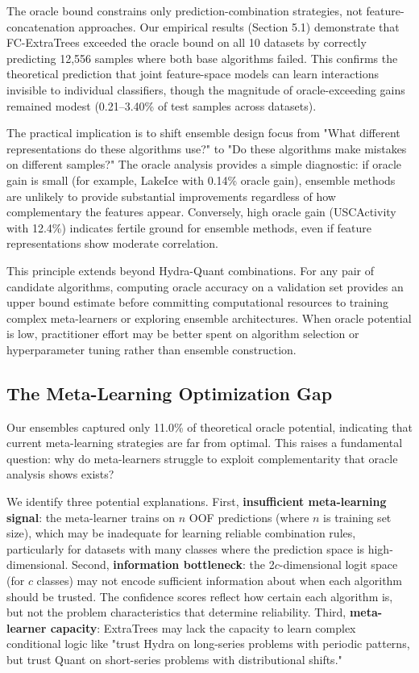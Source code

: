 \documentclass[pdflatex,sn-basic]{sn-jnl}           %
\theoremstyle{thmstyleone}%
\theoremstyle{thmstyletwo}%
\theoremstyle{thmstylethree}%
\begin{document}
The oracle bound constrains only prediction-combination strategies, not feature-concatenation approaches. Our empirical results (Section 5.1) demonstrate that FC-ExtraTrees exceeded the oracle bound on all 10 datasets by correctly predicting 12,556 samples where both base algorithms failed. This confirms the theoretical prediction that joint feature-space models can learn interactions invisible to individual classifiers, though the magnitude of oracle-exceeding gains remained modest (0.21--3.40\% of test samples across datasets).

The practical implication is to shift ensemble design focus from "What different representations do these algorithms use?" to "Do these algorithms make mistakes on different samples?" The oracle analysis provides a simple diagnostic: if oracle gain is small (for example, LakeIce with 0.14\% oracle gain), ensemble methods are unlikely to provide substantial improvements regardless of how complementary the features appear. Conversely, high oracle gain (USCActivity with 12.4\%) indicates fertile ground for ensemble methods, even if feature representations show moderate correlation.

This principle extends beyond Hydra-Quant combinations. For any pair of candidate algorithms, computing oracle accuracy on a validation set provides an upper bound estimate before committing computational resources to training complex meta-learners or exploring ensemble architectures. When oracle potential is low, practitioner effort may be better spent on algorithm selection or hyperparameter tuning rather than ensemble construction.

\subsection{The Meta-Learning Optimization Gap}

Our ensembles captured only 11.0\% of theoretical oracle potential, indicating that current meta-learning strategies are far from optimal. This raises a fundamental question: why do meta-learners struggle to exploit complementarity that oracle analysis shows exists?

We identify three potential explanations. First, \textbf{insufficient meta-learning signal}: the meta-learner trains on $n$ OOF predictions (where $n$ is training set size), which may be inadequate for learning reliable combination rules, particularly for datasets with many classes where the prediction space is high-dimensional. Second, \textbf{information bottleneck}: the 2$c$-dimensional logit space (for $c$ classes) may not encode sufficient information about when each algorithm should be trusted. The confidence scores reflect how certain each algorithm is, but not the problem characteristics that determine reliability. Third, \textbf{meta-learner capacity}: ExtraTrees may lack the capacity to learn complex conditional logic like "trust Hydra on long-series problems with periodic patterns, but trust Quant on short-series problems with distributional shifts."
\end{document}
